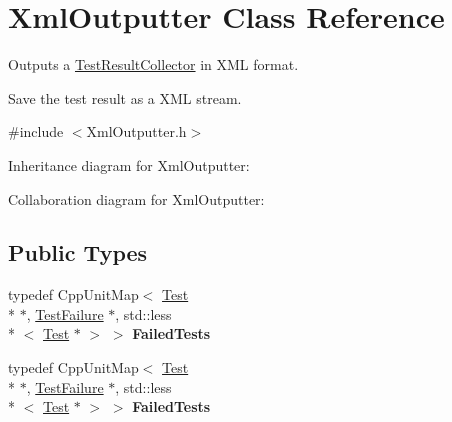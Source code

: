 \hypertarget{class_xml_outputter}{\section{Xml\+Outputter Class Reference}
\label{class_xml_outputter}
}


Outputs a \hyperlink{class_test_result_collector}{Test\+Result\+Collector} in X\+M\+L format.

Save the test result as a X\+M\+L stream.  




{\ttfamily \#include $<$Xml\+Outputter.\+h$>$}



Inheritance diagram for Xml\+Outputter\+:


Collaboration diagram for Xml\+Outputter\+:
\subsection*{Public Types}
\begin{DoxyCompactItemize}
\item 
\hypertarget{class_xml_outputter_a987608d04ba56dcc13461c9522f3da7e}{typedef Cpp\+Unit\+Map$<$ \hyperlink{class_test}{Test} \\*
$\ast$, \hyperlink{class_test_failure}{Test\+Failure} $\ast$, std\+::less\\*
$<$ \hyperlink{class_test}{Test} $\ast$ $>$ $>$ {\bfseries Failed\+Tests}}\label{class_xml_outputter_a987608d04ba56dcc13461c9522f3da7e}

\item 
\hypertarget{class_xml_outputter_a987608d04ba56dcc13461c9522f3da7e}{typedef Cpp\+Unit\+Map$<$ \hyperlink{class_test}{Test} \\*
$\ast$, \hyperlink{class_test_failure}{Test\+Failure} $\ast$, std\+::less\\*
$<$ \hyperlink{class_test}{Test} $\ast$ $>$ $>$ {\bfseries Failed\+Tests}}\label{class_xml_outputter_a987608d04ba56dcc13461c9522f3da7e}

\end{DoxyCompactItemize}
